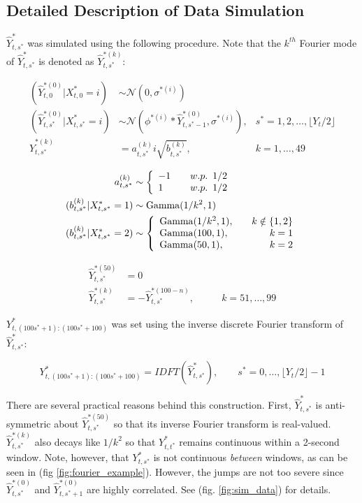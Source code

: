 \subsection{Detailed Description of Data Simulation}

$\hat{Y}^*_{t,s^*}$ was simulated using the following procedure. Note that the $k^{th}$ Fourier mode of $\hat{Y}^*_{t,s^*}$ is denoted as $\hat{Y}^{*(k)}_{t,s^*}$:

\begin{align*}
	(\hat{Y}^{*(0)}_{t,0}|X^*_{t,0} = i) &\sim \mathcal{N} \left(0, \sigma^{*(i)} \right) & \\
	(\hat{Y}^{*(0)}_{t,s^*}|X^*_{t,s^*} = i) &\sim \mathcal{N} \left(\phi^{*(i)} * \hat{Y}^{*(0)}_{t,s^*-1}, \sigma^{*(i)} \right), & s^* = 1,2,\ldots, \lfloor Y_t/2 \rfloor \\
	\hat{Y}^{*(k)}_{t,s^*} &= a_{t,s^*}^{(k)} i\sqrt{b^{(k)}_{t,s^*}}, & k = 1,\ldots,49 \\
\end{align*}
\begin{align*}
    a_{t,s^*}^{(k)} &\sim  \left\{\begin{array}{lr}
	-1 & \quad w.p. \enspace 1/2 \\
	1  & \quad w.p. \enspace 1/2
	\end{array}\right. \\
	(b^{(k)}_{t,s^*}|X^*_{t,s^*}  = 1) &\sim {\rm{Gamma}}(1/k^2, 1) \\
	(b^{(k)}_{t,s^*}|X^*_{t,s^*} = 2) &\sim \left\{\begin{array}{lr}
	{\rm{Gamma}}(1/k^2, 1), \quad & k \notin \{1,2\} \\
	{\rm{Gamma}}(100,1), & k = 1 \\
	{\rm{Gamma}}(50,1), & k = 2
	\end{array}\right. 
\end{align*}

\begin{align*}
    \hat{Y}^{*(50)}_{t,s^*} &= 0 & \\
	\hat{Y}^{*(k)}_{t,s^*}  &= -\hat{Y}^{*(100-n)}_{t,s^*}, & \qquad k = 51,\ldots,99
\end{align*}

$Y^*_{t,(100s^*+1):(100s^*+100)}$ was set using the inverse discrete Fourier transform of $\hat{Y}^*_{t,s^*}$:

$$Y^*_{t,(100s^*+1):(100s^*+100)} = IDFT\left(\hat{Y}^*_{t,s^*}\right), \qquad s^* = 0,\ldots,\lfloor Y_t/2 \rfloor - 1$$

There are several practical reasons behind this construction. First, $\hat{Y}^*_{t,s^*}$ is anti-symmetric about $\hat{Y}^{*(50)}_{t,s^*}$ so that its inverse Fourier transform is real-valued. $\hat{Y}^{*(k)}_{t,s^*}$ also decays like $1/k^2$ so that $Y^*_{t,t^*}$ remains continuous within a 2-second window. Note, however, that $Y^*_{t,s^*}$ is not continuous \textit{between} windows, as can be seen in (fig \ref{fig:fourier_example}). However, the jumps are not too severe since $\hat{Y}^{*(0)}_{t,s^*}$ and $\hat{Y}^{*(0)}_{t,s^*+1}$ are highly correlated. See (fig. \ref{fig:sim_data}) for details.

